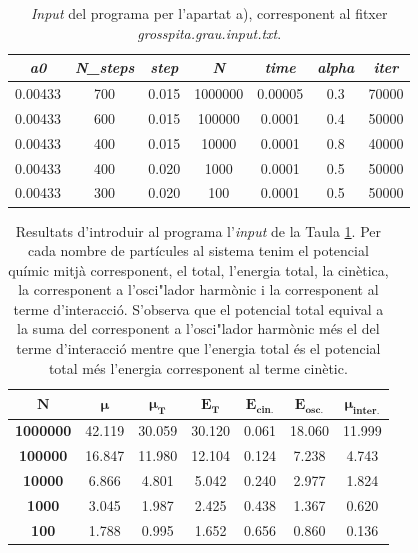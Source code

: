 \documentclass[a4paper]{article}
\begin{document}
\begin{table}[H]
    \centering
    \begin{tabular}{|c|c|c|c|c|c|c|}
        \hline
        \rowcolor[HTML]{EFEFEF}
        \textbf{\textit{a0}} & \textbf{\textit{N\_steps}} & \textbf{\textit{step}} &\textbf{\textit{N}} & \textbf{\textit{time}} & \textbf{\textit{alpha}} & \textbf{\textit{iter}} \\ \hline\hline
        0.00433 & 700 & 0.015 & 1000000 & 0.00005 & 0.3 & 70000 \\ \hline
        0.00433 & 600 & 0.015 & 100000  & 0.0001  & 0.4 & 50000 \\ \hline
        0.00433 & 400 & 0.015 & 10000   & 0.0001  & 0.8 & 40000 \\ \hline
        0.00433 & 400 & 0.020 & 1000    & 0.0001  & 0.5 & 50000 \\ \hline
        0.00433 & 300 & 0.020 & 100     & 0.0001  & 0.5 & 50000 \\ \hline
    \end{tabular}
\caption{\textit{Input} del programa per l'apartat a), corresponent al fitxer \textit{grosspita.grau.input.txt}.}
\label{tab:input_a}
\end{table}

\begin{table}[]
\centering
\begin{tabular}{|c|c|c|c|c|c|c|}
\hline
    \rowcolor[HTML]{EFEFEF}
    $\mathbf{N}$ & $\boldsymbol{\mu}$ & $\boldsymbol{\mu_{\textbf{T}}}$ & $\boldsymbol{E_{\textbf{T}}}$ & $\boldsymbol{E_{\textbf{cin.}}}$ & $\boldsymbol{E_{\textbf{osc.}}}$ & $\boldsymbol{\mu_{\textbf{inter.}}}$ \\ \hline\hline
    \textbf{1000000}  & 42.119 & 30.059  & 30.120     & 0.061  & 18.060 & 11.999   \\ \hline
    \textbf{100000}   & 16.847 & 11.980  & 12.104     & 0.124  & 7.238  & 4.743    \\ \hline
    \textbf{10000}    & 6.866  & 4.801   & 5.042      & 0.240  & 2.977  & 1.824    \\ \hline
    \textbf{1000}     & 3.045  & 1.987   & 2.425      & 0.438  & 1.367  & 0.620    \\ \hline
    \textbf{100}      & 1.788  & 0.995   & 1.652      & 0.656  & 0.860  & 0.136    \\\hline
\end{tabular} 
    \caption{Resultats d'introduir al programa l'\textit{input} de la Taula \ref{tab:input_a}. Per cada nombre de partícules al sistema tenim el potencial químic mitjà corresponent, el total, l'energia total, la cinètica, la corresponent a l'osci"lador harmònic i la corresponent al terme d'interacció. S'observa que el potencial total equival a la suma del corresponent a l'osci"lador harmònic més el del terme d'interacció mentre que l'energia total és el potencial total més l'energia corresponent al terme cinètic.}
    \label{tab:res_a}
\end{table}
\end{document}
